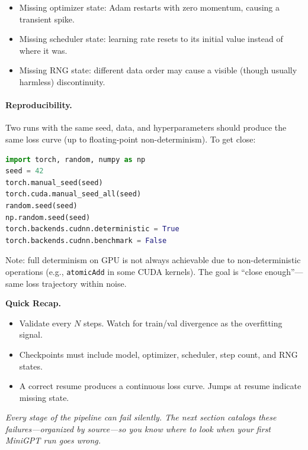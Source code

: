 \begin{itemize}[nosep]
  \item Missing optimizer state: Adam restarts with zero momentum, causing a transient spike.
  \item Missing scheduler state: learning rate resets to its initial value instead of where it was.
  \item Missing RNG state: different data order may cause a visible (though usually harmless) discontinuity.
\end{itemize}

\paragraph{Reproducibility.} Two runs with the same seed, data, and hyperparameters should produce the same loss curve (up to floating-point non-determinism). To get close:

\begin{lstlisting}[language=Python, caption={Reproducibility setup.}]
import torch, random, numpy as np
seed = 42
torch.manual_seed(seed)
torch.cuda.manual_seed_all(seed)
random.seed(seed)
np.random.seed(seed)
torch.backends.cudnn.deterministic = True
torch.backends.cudnn.benchmark = False
\end{lstlisting}

Note: full determinism on GPU is not always achievable due to non-deterministic operations (e.g., \texttt{atomicAdd} in some CUDA kernels). The goal is ``close enough''---same loss trajectory within noise.

\begin{quickrecap}
\textbf{Quick Recap.}
\begin{itemize}[nosep,leftmargin=1.5em]
  \item Validate every $N$ steps. Watch for train/val divergence as the overfitting signal.
  \item Checkpoints must include model, optimizer, scheduler, step count, and RNG states.
  \item A correct resume produces a continuous loss curve. Jumps at resume indicate missing state.
\end{itemize}
\textit{Every stage of the pipeline can fail silently. The next section catalogs these failures---organized by source---so you know where to look when your first MiniGPT run goes wrong.}
\end{quickrecap}


